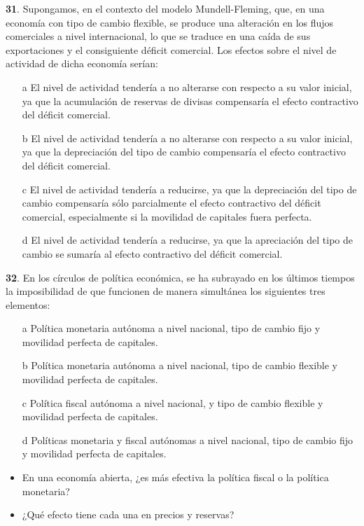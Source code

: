 \documentclass{nuevotema}
\begin{document}
\textbf{31}. Supongamos, en el contexto del modelo Mundell-Fleming, que, en una economía con tipo de cambio flexible, se produce una alteración en los flujos comerciales a nivel internacional, lo que se traduce en una caída de sus exportaciones y el consiguiente déficit comercial. Los efectos sobre el nivel de actividad de dicha economía serían:
\begin{enumerate}
	\item[a] El nivel de actividad tendería a no alterarse con respecto a su valor inicial, ya que la acumulación de reservas de divisas compensaría el efecto contractivo del déficit comercial.
	\item[b] El nivel de actividad tendería a no alterarse con respecto a su valor inicial, ya que la depreciación del tipo de cambio compensaría el efecto contractivo del déficit comercial.
	\item[c] El nivel de actividad tendería a reducirse, ya que la depreciación del tipo de cambio compensaría sólo parcialmente el efecto contractivo del déficit comercial, especialmente si la movilidad de capitales fuera perfecta.
	\item[d] El nivel de actividad tendería a reducirse, ya que la apreciación del tipo de cambio se sumaría al efecto contractivo del déficit comercial.
\end{enumerate}

\textbf{32}. En los círculos de política económica, se ha subrayado en los últimos tiempos la imposibilidad de que funcionen de manera simultánea los siguientes tres elementos:
\begin{enumerate} 
	\item[a] Política monetaria autónoma a nivel nacional, tipo de cambio fijo y movilidad perfecta de capitales.
	\item[b] Política monetaria autónoma a nivel nacional, tipo de cambio flexible y movilidad perfecta de capitales.
	\item[c] Política fiscal autónoma a nivel nacional, y tipo de cambio flexible y movilidad perfecta de capitales.
	\item[d] Políticas monetaria y fiscal autónomas a nivel nacional, tipo de cambio fijo y movilidad perfecta de capitales.
\end{enumerate}


\begin{itemize}
    \item En una economía abierta, ¿es más efectiva la política fiscal o la política monetaria?
    
    \item ¿Qué efecto tiene cada una en precios y reservas?
\end{itemize}
\end{document}
